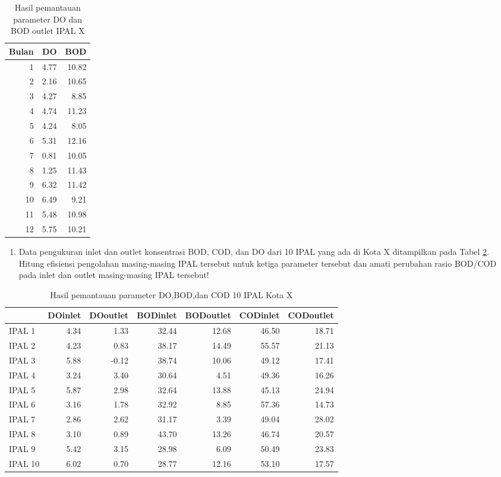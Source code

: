\documentclass[12pt,]{krantz}
\providecommand{\tightlist}{%
  \setlength{\itemsep}{0pt}\setlength{\parskip}{0pt}}
\begin{document}
\begin{table}

\caption{\label{tab:soal1}Hasil pemantauan parameter DO dan BOD outlet IPAL X}
\centering
\begin{tabular}[t]{r|r|r}
\hline
Bulan & DO & BOD\\
\hline
1 & 4.77 & 10.82\\
\hline
2 & 2.16 & 10.65\\
\hline
3 & 4.27 & 8.85\\
\hline
4 & 4.74 & 11.23\\
\hline
5 & 4.24 & 8.05\\
\hline
6 & 5.31 & 12.16\\
\hline
7 & 0.81 & 10.05\\
\hline
8 & 1.25 & 11.43\\
\hline
9 & 6.32 & 11.42\\
\hline
10 & 6.49 & 9.21\\
\hline
11 & 5.48 & 10.98\\
\hline
12 & 5.75 & 10.21\\
\hline
\end{tabular}
\end{table}

\begin{enumerate}
\def\labelenumi{\arabic{enumi}.}
\setcounter{enumi}{1}
\tightlist
\item
  Data pengukuran inlet dan outlet konsentrasi BOD, COD, dan DO dari 10 IPAL yang ada di Kota X ditampilkan pada Tabel \ref{tab:soal2}. Hitung efisiensi pengolahan masing-masing IPAL tersebut untuk ketiga parameter tersebut dan amati perubahan rasio BOD/COD pada inlet dan outlet masing-masing IPAL tersebut!
\end{enumerate}

\begin{table}

\caption{\label{tab:soal2}Hasil pemantauan parameter DO,BOD,dan COD 10 IPAL Kota X}
\centering
\begin{tabular}[t]{l|r|r|r|r|r|r}
\hline
  & DOinlet & DOoutlet & BODinlet & BODoutlet & CODinlet & CODoutlet\\
\hline
IPAL 1 & 4.34 & 1.33 & 32.44 & 12.68 & 46.50 & 18.71\\
\hline
IPAL 2 & 4.23 & 0.83 & 38.17 & 14.49 & 55.57 & 21.13\\
\hline
IPAL 3 & 5.88 & -0.12 & 38.74 & 10.06 & 49.12 & 17.41\\
\hline
IPAL 4 & 3.24 & 3.40 & 30.64 & 4.51 & 49.36 & 16.26\\
\hline
IPAL 5 & 5.87 & 2.98 & 32.64 & 13.88 & 45.13 & 24.94\\
\hline
IPAL 6 & 3.16 & 1.78 & 32.92 & 8.85 & 57.36 & 14.73\\
\hline
IPAL 7 & 2.86 & 2.62 & 31.17 & 3.39 & 49.04 & 28.02\\
\hline
IPAL 8 & 3.10 & 0.89 & 43.70 & 13.26 & 46.74 & 20.57\\
\hline
IPAL 9 & 5.42 & 3.15 & 28.98 & 6.09 & 50.49 & 23.83\\
\hline
IPAL 10 & 6.02 & 0.70 & 28.77 & 12.16 & 53.10 & 17.57\\
\hline
\end{tabular}
\end{table}
\end{document}
